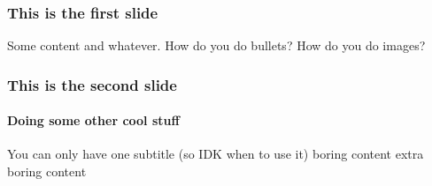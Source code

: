 \documentclass{beamer}
\begin{document}
 
   \begin{frame} 
      \frametitle{This is the first slide}
      Some content and whatever.
      How do you do bullets?
      How do you do images?
   \end{frame}
   \begin{frame}
      \frametitle{This is the second slide}
      \framesubtitle{Doing some other cool stuff}
         You can only have one subtitle (so IDK when to use it)
         boring content
         extra boring content
   \end{frame}
\end{document}
